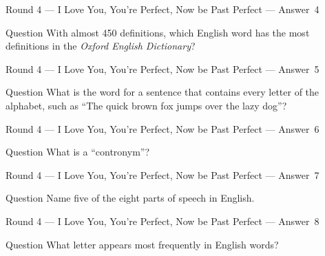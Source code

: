 \documentclass[11pt]{beamer}
\begin{document}
\begin{frame}[t]{Round 4 --- I Love You, You're Perfect, Now be Past Perfect --- \mbox{Answer 4}}
\vspace{-0.5em}
\begin{block}{Question}
With almost 450 definitions, which English word has the most definitions in the \emph{Oxford English Dictionary}?
\end{block}
\end{frame}
\begin{frame}[t]{Round 4 --- I Love You, You're Perfect, Now be Past Perfect --- \mbox{Answer 5}}
\vspace{-0.5em}
\begin{block}{Question}
What is the word for a sentence that contains every letter of the alphabet, such as ``The quick brown fox jumps over the lazy dog''?
\end{block}
\end{frame}
\begin{frame}[t]{Round 4 --- I Love You, You're Perfect, Now be Past Perfect --- \mbox{Answer 6}}
\vspace{-0.5em}
\begin{block}{Question}
What is a ``contronym''?
\end{block}
\end{frame}
\begin{frame}[t]{Round 4 --- I Love You, You're Perfect, Now be Past Perfect --- \mbox{Answer 7}}
\vspace{-0.5em}
\begin{block}{Question}
Name five of the eight parts of speech in English.
\end{block}
\end{frame}
\begin{frame}[t]{Round 4 --- I Love You, You're Perfect, Now be Past Perfect --- \mbox{Answer 8}}
\vspace{-0.5em}
\begin{block}{Question}
What letter appears most frequently in English words?
\end{block}
\end{frame}
\end{document}
